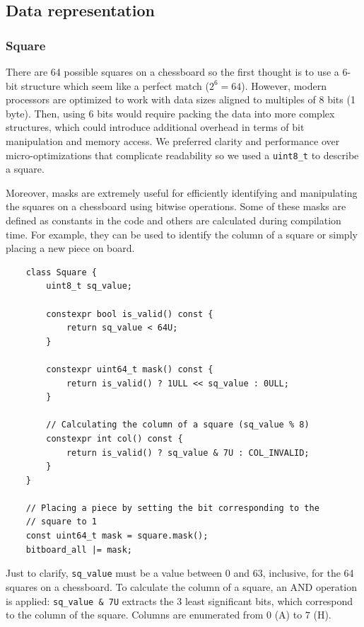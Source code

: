 \subsection{Data representation}

\subsubsection{Square}

There are 64 possible squares on a chessboard so the first thought is to use a 6-bit structure which seem like a perfect match ($2^6 = 64$). However, modern processors are optimized to work with data sizes aligned to multiples of 8 bits (1 byte). Then, using 6 bits would require packing the data into more complex structures, which could introduce additional overhead in terms of bit manipulation and memory access. We preferred clarity and performance over micro-optimizations that complicate readability so we used a \texttt{uint8\_t} to describe a square.

\vspace{1em}

\noindent Moreover, masks are extremely useful for efficiently identifying and manipulating the squares on a chessboard using bitwise operations. Some of these masks are defined as constants in the code and others are calculated during compilation time. For example, they can be used to identify the column of a square or simply placing a new piece on board.

\begin{lstlisting}
    class Square {
        uint8_t sq_value;

        constexpr bool is_valid() const {
            return sq_value < 64U;
        }

        constexpr uint64_t mask() const {
            return is_valid() ? 1ULL << sq_value : 0ULL;
        }

        // Calculating the column of a square (sq_value % 8)
        constexpr int col() const {
            return is_valid() ? sq_value & 7U : COL_INVALID;
        }
    }

    // Placing a piece by setting the bit corresponding to the
    // square to 1
    const uint64_t mask = square.mask();
    bitboard_all |= mask;
\end{lstlisting}

\noindent Just to clarify, \texttt{sq\_value} must be a value between $0$ and $63$, inclusive, for the 64 squares on a chessboard. To calculate the column of a square, an AND operation is applied: \texttt{sq\_value \& 7U} extracts the 3 least significant bits, which correspond to the column of the square. Columns are enumerated from $0$ (A) to $7$ (H).

